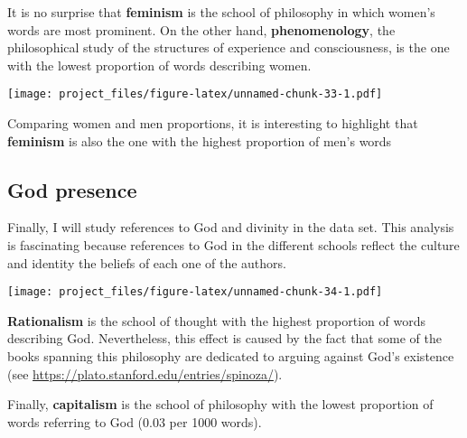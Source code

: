 \documentclass[
]{article}
\begin{document}
It is no surprise that \textbf{feminism} is the school of philosophy in
which women's words are most prominent. On the other hand,
\textbf{phenomenology}, the philosophical study of the structures of
experience and consciousness, is the one with the lowest proportion of
words describing women.

\texttt{[image: project\_files/figure-latex/unnamed-chunk-33-1.pdf]}

Comparing women and men proportions, it is interesting to highlight that
\textbf{feminism} is also the one with the highest proportion of men's
words

\hypertarget{god-presence}{%
\subsection{God presence}\label{god-presence}}

Finally, I will study references to God and divinity in the data set.
This analysis is fascinating because references to God in the different
schools reflect the culture and identity the beliefs of each one of the
authors.

\texttt{[image: project\_files/figure-latex/unnamed-chunk-34-1.pdf]}

\textbf{Rationalism} is the school of thought with the highest
proportion of words describing God. Nevertheless, this effect is caused
by the fact that some of the books spanning this philosophy are
dedicated to arguing against God's existence (see
\url{https://plato.stanford.edu/entries/spinoza/}).

Finally, \textbf{capitalism} is the school of philosophy with the lowest
proportion of words referring to God (0.03 per 1000 words).
\end{document}

